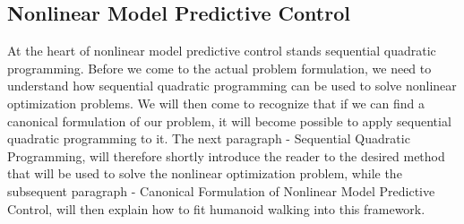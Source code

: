 \FloatBarrier
\subsection{Nonlinear Model Predictive Control}
\label{sec::212_nmpc}
At the heart of nonlinear model predictive control stands sequential quadratic programming. Before we come to the actual problem formulation, we need to understand how sequential quadratic programming can be used to solve nonlinear optimization problems. We will then come to recognize that if we can find a canonical formulation of our problem, it will become possible to apply sequential quadratic programming to it. The next paragraph - Sequential Quadratic Programming, will therefore shortly introduce the reader to the desired method that will be used to solve the  nonlinear optimization problem, while the subsequent paragraph - Canonical Formulation of Nonlinear Model Predictive Control, will then explain how to fit humanoid walking into this framework.
\FloatBarrier
